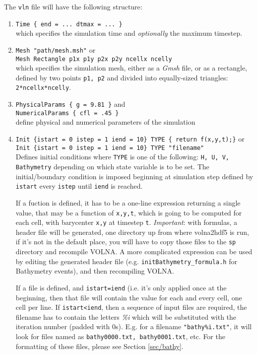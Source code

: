 \documentclass[11pt]{article}
\begin{document}
The \texttt{vln} file will have the following structure:
\begin{enumerate} 
\item \texttt{Time \{ end = ... dtmax = ... \}}\\
which specifies the simulation time and \textit{optionally} the maximum timestep.
\item \texttt{Mesh "path/mesh.msh"} or\\
\texttt{Mesh Rectangle p1x p1y p2x p2y ncellx ncelly}\\
which specifies the simulation mesh, either as a \textit{Gmsh} file, or as a rectangle, defined by two points \texttt{p1, p2} and divided into equally-sized triangles: \texttt{2*ncellx*ncelly}.
\item \texttt{PhysicalParams \{ g = 9.81 \}} and\\
\texttt{NumericalParams \{ cfl = .45 \}}\\
define physical and numerical parameters of the simulation
\item \texttt{Init \{istart = 0 istep = 1 iend = 10\} TYPE \{ return f(x,y,t);\}} or \\
\texttt{Init \{istart = 0 istep = 1 iend = 10\} TYPE "filename"}\\
Defines initial conditions where \texttt{TYPE} is one of the following: \texttt{H, U, V, Bathymetry} depending on which state variable is to be set. The initial/boundary condition is imposed beginning at simulation step defined by \texttt{istart} every \texttt{istep} until \texttt{iend} is reached.

If a fuction is defined, it has to be a one-line expression returning a single value, that may be a function of \texttt{x,y,t}, which is going to be computed for each cell, with barycenter \texttt{x,y} at timestep \texttt{t}. \emph{Important}: with formulas, a header file will be generated, one directory up from where volna2hdf5 is run, if it's not in the default place, you will have to copy those files to the \texttt{sp} directory and recompile VOLNA. A more complicated expression can be used by editing the generated header file (e.g. \texttt{initBathymetry\_formula.h} for Bathymetry events), and then recompiling VOLNA.

If a file is defined, and \texttt{istart=iend} (i.e. it's only applied once at the beginning, then that file will contain the value for each and every cell, one cell per line. If \texttt{istart<iend}, then a sequence of input files are required, the filename has to contain the letters \textit{\%i} which will be substituted with the iteration number (padded with 0s). E.g. for a filename \texttt{"bathy\%i.txt"}, it will look for files named as \texttt{bathy0000.txt, bathy0001.txt}, etc. For the formatting of these files, please see Section \ref{sec/bathy}.


\end{enumerate}
\end{document}
